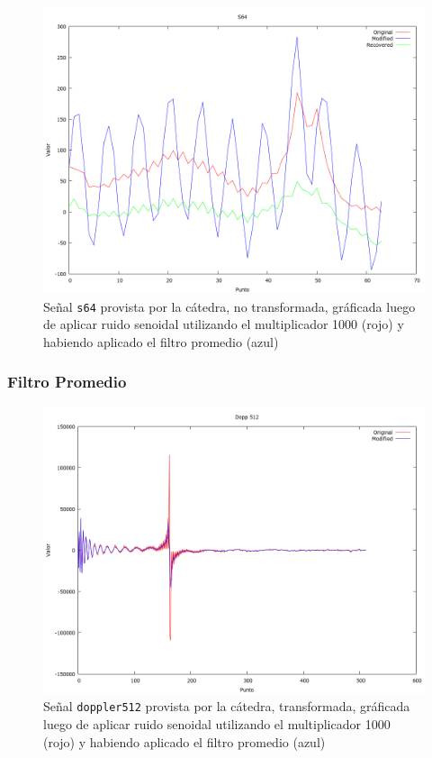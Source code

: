\begin{figure}[H]
\begin {center}
\includegraphics[width=500pt]{imagenes/s64-sin100-exp.png}
\end {center}
\caption{Se\~nal \texttt{s64} provista por la c\'atedra, no transformada, gr\'aficada
luego de aplicar ruido senoidal utilizando el multiplicador 1000 (rojo) y 
habiendo aplicado el filtro promedio (azul)}
\label{fig:SexpSig}
\end{figure}


\subsubsection{Filtro Promedio}


\begin{figure}[H]
\begin {center}
\includegraphics[width=500pt]{imagenes/dopp512-sin100-avg-spec.png}
\end {center}
\caption{Se\~nal \texttt{doppler512} provista por la c\'atedra, transformada, gr\'aficada
luego de aplicar ruido senoidal utilizando el multiplicador 1000 (rojo) y 
habiendo aplicado el filtro promedio (azul)}
\label{fig:SinProm}
\end{figure}

